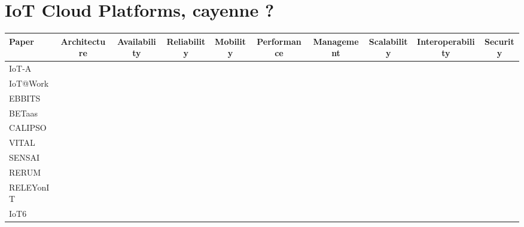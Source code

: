 \section{IoT Cloud Platforms, cayenne ?} %
\label{subsec:cloud_app}


\begin{table}[h!]
\scriptsize
	\begin{tabulary}{\textwidth}{L|C|C|C|C|C|C|C|C|C}
	Paper           & Architecture & Availability & Reliability & Mobility & Performance & Management & Scalability & Interoperability & Security\\\hline
	IoT-A           &              &              &             &          &             &            &             &                  &         \\\hline
	IoT@Work        &              &              &             &          &             &            &             &                  &         \\\hline
	EBBITS          &              &              &             &          &             &            &             &                  &         \\\hline
	BETaas          &              &              &             &          &             &            &             &                  &         \\\hline
	CALIPSO         &              &              &             &          &             &            &             &                  &         \\\hline
	VITAL           &              &              &             &          &             &            &             &                  &         \\\hline
	SENSAI          &              &              &             &          &             &            &             &                  &         \\\hline
	RERUM           &              &              &             &          &             &            &             &                  &         \\\hline
	RELEYonIT       &              &              &             &          &             &            &             &                  &         \\\hline
	IoT6            &              &              &             &          &             &            &             &                  &         \\\hline

\end{tabulary}
\end{table}
